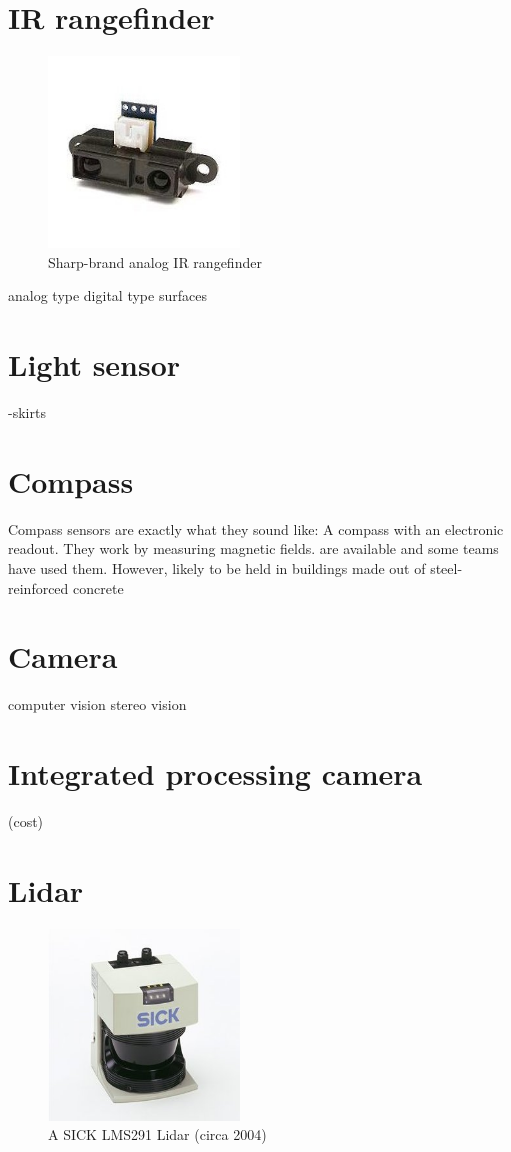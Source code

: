 \documentclass{article}
\begin{document}
\section{IR rangefinder}
\begin{figure}[ht]
\centering
\includegraphics[width=2in]{ir-rangefinder.jpg}
\caption{Sharp-brand analog IR rangefinder}
\end{figure}

analog type
digital type
surfaces
\section{Light sensor}
		-skirts
\section{Compass}

Compass sensors are exactly what they sound like: A compass with an electronic readout.  They work by measuring magnetic fields.  are available and some teams have used them.  However, likely to be held in buildings made out of steel-reinforced concrete
\section{Camera}
computer vision
stereo vision
\section{Integrated processing camera}
 (cost)
\section{Lidar}
\begin{figure}[ht]
\centering
\includegraphics[width=2in]{SICK_LMS291.jpg}
\caption{A SICK LMS291 Lidar (circa 2004)}
\end{figure}
\end{document}
